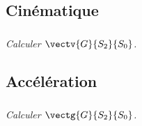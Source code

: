 \subsection*{Cinématique}
%
%

\subparagraph{}
\textit{Calculer $\vectv{G}{S_2}{S_0}$.}




%

\subsection*{Accélération}

\subparagraph{}
\textit{Calculer $\vectg{G}{S_2}{S_0}$.}


